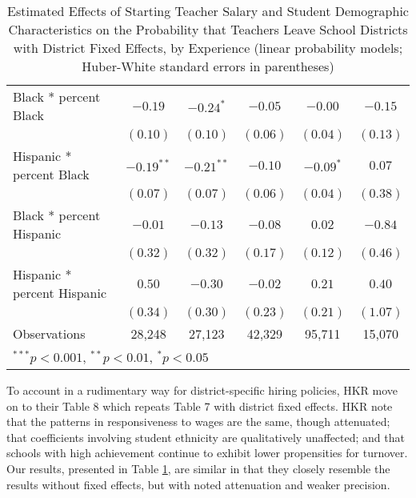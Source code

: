 \documentclass[12pt,]{article}
\begin{document}
\begin{table}
\begin{center}
\begin{tabular}{l c c c c c }
\quad Black * percent Black                 & $-0.19$      & $-0.24^{*}$  & $-0.05$      & $-0.00$     & $-0.15$      \\
                                            & $(0.10)$     & $(0.10)$     & $(0.06)$     & $(0.04)$    & $(0.13)$     \\
\quad Hispanic * percent Black              & $-0.19^{**}$ & $-0.21^{**}$ & $-0.10$      & $-0.09^{*}$ & $0.07$       \\
                                            & $(0.07)$     & $(0.07)$     & $(0.06)$     & $(0.04)$    & $(0.38)$     \\
\quad Black * percent Hispanic              & $-0.01$      & $-0.13$      & $-0.08$      & $0.02$      & $-0.84$      \\
                                            & $(0.32)$     & $(0.32)$     & $(0.17)$     & $(0.12)$    & $(0.46)$     \\
\quad Hispanic * percent Hispanic           & $0.50$       & $-0.30$      & $-0.02$      & $0.21$      & $0.40$       \\
                                            & $(0.34)$     & $(0.30)$     & $(0.23)$     & $(0.21)$    & $(1.07)$     \\
\hline
Observations                                & 28,248        & 27,123        & 42,329        & 95,711       & 15,070        \\
\hline
\multicolumn{6}{l}{\scriptsize{$^{***}p<0.001$, $^{**}p<0.01$, $^*p<0.05$}}
\end{tabular}
\caption{Estimated Effects of Starting Teacher Salary and Student Demographic Characteristics on the Probability that Teachers Leave School Districts with District Fixed Effects, by Experience (linear probability models; Huber-White standard errors in parentheses)}
\label{tbl:reg_lpm_fe}
\end{center}
\end{table}

To account in a rudimentary way for district-specific hiring policies,
HKR move on to their Table 8 which repeats Table 7 with district fixed
effects. HKR note that the patterns in responsiveness to wages are the
same, though attenuated; that coefficients involving student ethnicity
are qualitatively unaffected; and that schools with high achievement
continue to exhibit lower propensities for turnover. Our results,
presented in Table \ref{tbl:reg_lpm_fe}, are similar in that they
closely resemble the results without fixed effects, but with noted
attenuation and weaker precision.
\end{document}
